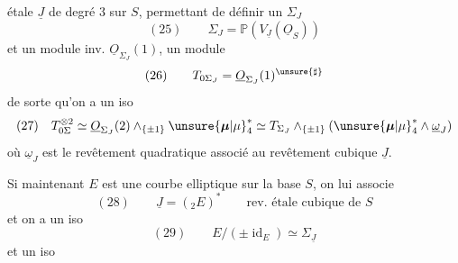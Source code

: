 
étale $\underline{J}$ de degré $3$ sur $S$, permettant de définir un $\Sigma_J$
\[
(25)\qquad \Sigma_J=\mathbb{P}(V_{\underline{J}}(\underline{O}_S))
\]
et un module inv. $\underline{O}_{\Sigma_J}(1)$, un module
\[
(26)\qquad T_{0\Sigma_J}=\underline{O}_{\Sigma_J}(1)^{\unsure{\sharp}}
\]
de sorte qu'on a un iso
\[
(27)\quad T_{0\Sigma}^{\otimes2}\simeq\underline{O}_{\Sigma_J}(2)\wedge_{\{\pm1\}}\unsure{\boldsymbol{\mu}|\mu}_4^*\simeq T_{\Sigma_J}\wedge_{\{\pm1\}}(\unsure{\boldsymbol{\mu}|\mu}_4^*\wedge\underline{\omega}_J)
\]
où $\underline{\omega}_J$ est le revêtement quadratique associé au revêtement cubique $\underline{J}$.

Si maintenant $E$ est une courbe elliptique sur la base $S$, on lui associe
\[
(28)\qquad \underline{J}=({}_2E)^*\qquad\text{rev. étale cubique de }S
\]
et on a un iso
\[
(29)\qquad E/(\pm\operatorname{id}_E)\simeq\Sigma_{\underline{J}}
\]
et un iso
